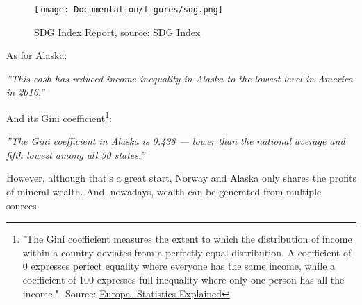 \begin{enumerate}
    \begin{figure}[htbp]
	   \centering
	   \texttt{[image: Documentation/figures/sdg.png]}  %
	   \caption{SDG Index Report, source: \href{https://dashboards.sdgindex.org/rankings}{SDG Index}}
	   \label{fig:sdg}
    \end{figure}

As for Alaska:

\begin{flushright}
   \textsl{''This cash has reduced income inequality in Alaska to the lowest level in America in 2016.'' \cite{huffpost}} \\
\end{flushright}

\begin{comment}
    \vspace*{1cm}
        Dayen, D., "Alaska Gives Cash To Its Citizens Every Year. The Rest Of The U.S. Could Too", \href{https://www.huffpost.com/entry/sovereign-wealth-fund-for-america-alaska-norway_n_5b83ffb7e4b0cd327dfe878e}{HuffPost}
\end{comment}

And its Gini coefficient\footnote{"The Gini coefficient measures the extent to which the distribution of income within a country deviates from a perfectly equal distribution. A coefficient of 0 expresses perfect equality where everyone has the same income, while a coefficient of 100 expresses full inequality where only one person has all the income."- Source: \href{https://ec.europa.eu/eurostat/statistics-explained/index.php?title=Glossary:Gini_coefficient}{Europa- Statistics Explained}}:

\begin{flushright}
   \textsl{''The Gini coefficient in Alaska is 0.438 — lower than the national average and fifth lowest among all 50 states.'' \cite{247}} \\

\end{flushright}

\begin{comment}
    \vspace*{1cm}
        Stebbins, S., "How Income Inequality in Alaska Compares to Other States", \href{https://247wallst.com/state/how-income-inequality-in-alaska-compares-to-other-states/}{24/7 Wall Street}
\end{comment}

However, although that's a great start, Norway and Alaska only shares the profits of mineral wealth. And, nowadays, wealth can be generated from multiple sources.\newline



\end{enumerate}
